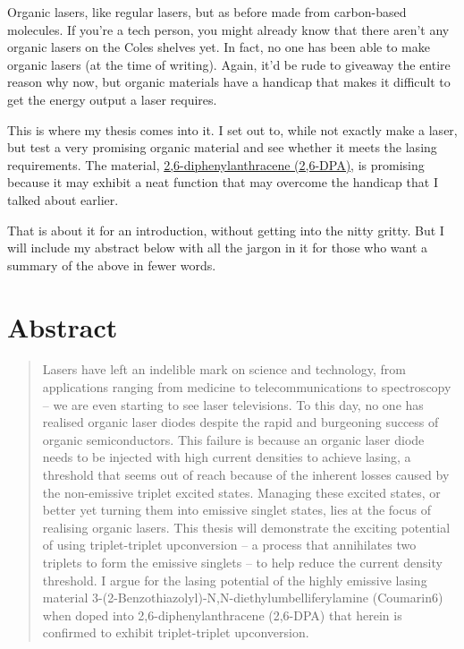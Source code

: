 \documentclass[
  letterpaper,
  DIV=11,
  numbers=noendperiod,
  oneside]{scrreprt}
\begin{document}
Organic lasers, like regular lasers, but as before made from
carbon-based molecules. If you're a tech person, you might already know
that there aren't any organic lasers on the Coles shelves yet. In fact,
no one has been able to make organic lasers (at the time of writing).
Again, it'd be rude to giveaway the entire reason why now, but organic
materials have a handicap that makes it difficult to get the energy
output a laser requires.

This is where my thesis comes into it. I set out to, while not exactly
make a laser, but test a very promising organic material and see whether
it meets the lasing requirements. The material,
\href{https://pubchem.ncbi.nlm.nih.gov/compound/2_6-Diphenylanthracene}{2,6-diphenylanthracene
(2,6-DPA)}, is promising because it may exhibit a neat function that may
overcome the handicap that I talked about earlier.

That is about it for an introduction, without getting into the nitty
gritty. But I will include my abstract below with all the jargon in it
for those who want a summary of the above in fewer words.


\hypertarget{abstract}{%
\chapter*{Abstract}\label{abstract}}


\begin{quote}
Lasers have left an indelible mark on science and technology, from
applications ranging from medicine to telecommunications to spectroscopy
-- we are even starting to see laser televisions. To this day, no one
has realised organic laser diodes despite the rapid and burgeoning
success of organic semiconductors. This failure is because an organic
laser diode needs to be injected with high current densities to achieve
lasing, a threshold that seems out of reach because of the inherent
losses caused by the non-emissive triplet excited states. Managing these
excited states, or better yet turning them into emissive singlet states,
lies at the focus of realising organic lasers. This thesis will
demonstrate the exciting potential of using triplet-triplet upconversion
-- a process that annihilates two triplets to form the emissive singlets
-- to help reduce the current density threshold. I argue for the lasing
potential of the highly emissive lasing material
3-(2-Benzothiazolyl)-N,N-diethylumbelliferylamine (Coumarin6) when doped
into 2,6-diphenylanthracene (2,6-DPA) that herein is confirmed to
exhibit triplet-triplet upconversion.
\end{quote}
\end{document}
